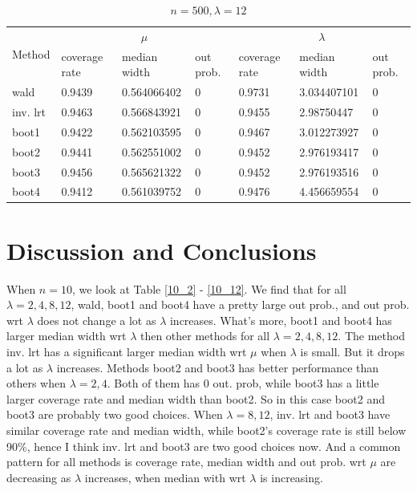\documentclass{article}
\begin{document}
\begin{table}
        \begin{subtable}[b]{\textwidth}
		\centering
		\begin{tabular}{l|lll|lll}
		\toprule
        \multirow{2}{*}{Method} & \multicolumn{3}{c|}{$\mu$}      & \multicolumn{3}{c}{$\lambda$}  \\ 
                           & coverage rate & median width & out prob. & coverage rate & median width & out prob. \\
                           \midrule
wald      & 0.9439	&0.564066402	&0 & 0.9731	&3.034407101	&0\\
inv. lrt  & 0.9463	&0.566843921	&0 & 0.9455	&2.98750447	&0\\
boot1     & 0.9422	&0.562103595	&0 & 0.9467	&3.012273927	&0\\
boot2     & 0.9441	&0.562551002	&0 & 0.9452	&2.976193417	&0\\
boot3     & 0.9456	&0.565621322	&0 & 0.9452	&2.976193516	&0\\
boot4     & 0.9412	&0.561039752	&0 & 0.9476	&4.456659554	&0\\
       \bottomrule
       \end{tabular}
       \caption{$n = 500, \lambda = 12$}
       \label{500_12}
       \end{subtable}%


       \end{table}

       \clearpage
	\section{Discussion and Conclusions}\label{discussion}

	When $n = 10$, we look at Table \ref{10_2} - \ref{10_12}. We find that for all $\lambda = 2, 4, 8, 12$, wald, boot1 and boot4 have a pretty large out prob., and out prob. wrt $\lambda$ does not change a lot as $\lambda$ increases. What's more, boot1 and boot4 has larger median width wrt $\lambda$ then other methods for all $\lambda = 2, 4, 8, 12$. The method inv. lrt has a significant larger median width wrt $\mu$ when $\lambda$ is small. But it drops a lot as $\lambda$ increases. Methods boot2 and boot3 has better performance than others when $\lambda = 2, 4$. Both of them has 0 out. prob, while boot3 has a little larger coverage rate and median width than boot2. So in this case boot2 and boot3 are probably two good choices. When $\lambda = 8, 12$, inv. lrt and boot3 have similar coverage rate and median width, while boot2's coverage rate is still below 90\%, hence I think inv. lrt and boot3 are two good choices now. And a common pattern for all methods is coverage rate, median width and out prob. wrt $\mu$ are decreasing as $\lambda$ increases, when median with wrt $\lambda$ is increasing.
\end{document}
